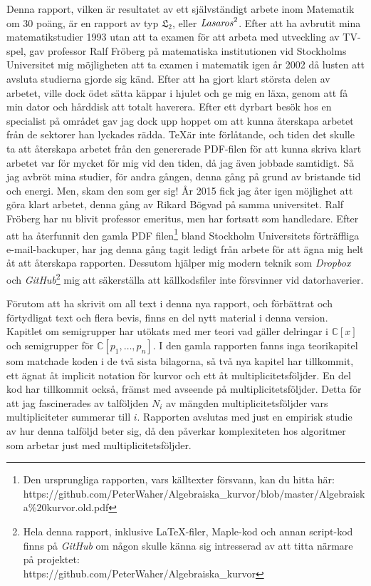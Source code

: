 \documentclass[twoside]{report}
\begin{document}
Denna rapport, vilken är resultatet av ett självständigt arbete inom Matematik om 30 poäng, är en rapport av typ $\mathfrak{L}_2$, eller $\text{\emph{Lasaros}}^2$. Efter att ha avbrutit mina matematikstudier 1993 utan att ta examen för att arbeta med utveckling av TV-spel, gav professor Ralf Fröberg på matematiska institutionen vid Stockholms Universitet mig möjligheten att ta examen i matematik igen år 2002 då lusten att avsluta studierna gjorde sig känd. Efter att ha gjort klart största delen av arbetet, ville dock ödet sätta käppar i hjulet och ge mig en läxa, genom att få min dator och hårddisk att totalt haverera. Efter ett dyrbart besök hos en specialist på området gav jag dock upp hoppet om att kunna återskapa arbetet från de sektorer han lyckades rädda. \TeX är inte förlåtande, och tiden det skulle ta att återskapa arbetet från den genererade PDF-filen för att kunna skriva klart arbetet var för mycket för mig vid den tiden, då jag även jobbade samtidigt. Så jag avbröt mina studier, för andra gången, denna gång på grund av bristande tid och energi. Men, skam den som ger sig! År 2015 fick jag åter igen möjlighet att göra klart arbetet, denna gång av Rikard Bögvad på samma universitet. Ralf Fröberg har nu blivit professor emeritus, men har fortsatt som handledare. Efter att ha återfunnit den gamla PDF filen\footnote{Den ursprungliga rapporten, vars källtexter försvann, kan du hitta här:\\ https://github.com/PeterWaher/Algebraiska\_kurvor/blob/master/Algebraiska\%20kurvor.old.pdf} bland Stockholm Universitets förträffliga e-mail-backuper, har jag denna gång tagit ledigt från arbete för att ägna mig helt åt att återskapa rapporten. Dessutom hjälper mig modern teknik som \emph{Dropbox} och \emph{GitHub}\footnote{Hela denna rapport, inklusive \LaTeX-filer, Maple-kod och annan script-kod finns på \emph{GitHub} om någon skulle känna sig intresserad av att titta närmare på projektet:\\
https://github.com/PeterWaher/Algebraiska\_kurvor} mig att säkerställa att källkodsfiler inte försvinner vid datorhaverier.

Förutom att ha skrivit om all text i denna nya rapport, och förbättrat och förtydligat text och flera bevis, finns en del nytt material i denna version. Kapitlet om semigrupper har utökats med mer teori vad gäller delringar i $\mathbb{C}[x]$ och semigrupper för $\mathbb{C}[p_1,\ldots,p_n]$. I den gamla rapporten fanns inga teorikapitel som matchade koden i de två sista bilagorna, så två nya kapitel har tillkommit, ett ägnat åt implicit notation för kurvor och ett åt multiplicitetsföljder. En del kod har tillkommit också, främst med avseende på multiplicitetsföljder. Detta för att jag fascinerades av talföljden $N_i$ av mängden multiplicitetsföljder vars multipliciteter summerar till $i$. Rapporten avslutas med just en empirisk studie av hur denna talföljd beter sig, då den påverkar komplexiteten hos algoritmer som arbetar just med multiplicitetsföljder.
\end{document}
